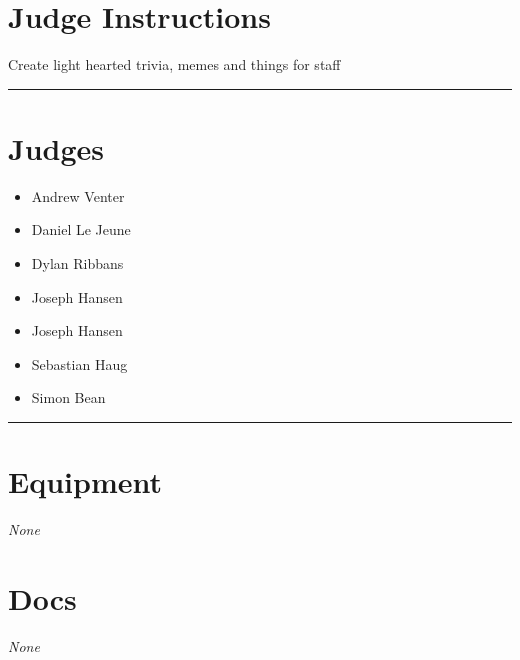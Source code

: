 \documentclass[10pt]{article}
\begin{document}
		\section*{Judge Instructions}
		Create light hearted trivia, memes and things for staff
\vspace{0.5cm}
	\hrule
	\vspace{0.5cm}
		\section*{\faUsers \: Judges}

		

	\begin{multicols}{2}

		\begin{itemize}
									\item Andrew Venter
									\item Daniel Le Jeune
									\item Dylan Ribbans
									\item Joseph Hansen
						\end{itemize}

		\vfill\null
		\columnbreak

		\begin{itemize}
									\item Joseph Hansen
									\item Sebastian Haug
									\item Simon Bean
						\end{itemize}

		\vfill\null

		\end{multicols}



			\vspace{0.5cm}
	\hrule
	\vspace{0.5cm}

	\begin{multicols}{2}

		\section*{\faWrench \: Equipment}

				\textit{None}
		
		\vfill\null
		\columnbreak

			\section*{\faFile \: Docs}
		 	\textit{None}
	

		\vfill\null

		\end{multicols}
\end{document}

